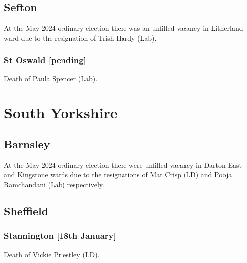\documentclass[a4paper,openany]{book}
\begin{document}
\begin{resultsiii}
\subsection*{Sefton}

At the May 2024 ordinary election there was an unfilled vacancy in Litherland ward due to the resignation of Trish Hardy (Lab).%

\subsubsection*{St Oswald \hspace*{\fill}\nolinebreak[1]%
	\enspace\hspace*{\fill}
	[pending]}


Death of Paula Spencer (Lab).

\section{South Yorkshire}

\subsection*{Barnsley}

At the May 2024 ordinary election there were unfilled vacancy in Darton East and Kingstone wards due to the resignations of Mat Crisp (LD) and Pooja Ramchandani (Lab) respectively.%

\subsection*{Sheffield}

\subsubsection*{Stannington \hspace*{\fill}\nolinebreak[1]%
	\enspace\hspace*{\fill}
	[18th January]}


Death of Vickie Priestley (LD).


\end{resultsiii}
\end{document}
